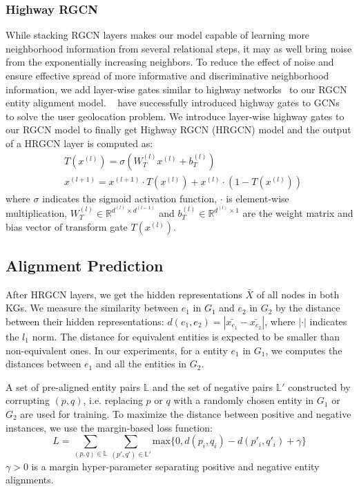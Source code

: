 	
	\subsubsection{Highway RGCN}
	\label{section:hgcn}
	While stacking RGCN layers makes our model capable of learning more neighborhood information from several relational steps, it may as well bring noise from the exponentially increasing neighbors. To reduce the effect of noise and ensure effective spread of more informative and discriminative neighborhood information, we add layer-wise gates similar to highway networks~\cite{Srivastava2015Highway} to our RGCN entity alignment model. ~\cite{Rahimi2018Semi} have successfully introduced highway gates to GCNs~\cite{Kipf2016Semi} to solve the user geolocation problem. We introduce layer-wise highway gates to our RGCN model to finally get Highway RGCN (HRGCN) model and the output of a HRGCN layer is computed as:
	\begin{equation}
	\begin{split}
	&T(x^{(l)})=\sigma(W_T^{(l)}x^{(l)}+b_T^{(l)}) \\
	&x^{(l+1)}=x^{(l+1)} \cdot T(x^{(l)})+x^{(l)} \cdot (1-T(x^{(l)}))
	\end{split}
	\end{equation}
	where $\sigma$ indicates the sigmoid activation function, $\cdot$ is element-wise multiplication, $W_T^{(l)} \in \mathbb{R}^{d^{(l)} \times d^{(l-1)}}$ and $b_T^{(l)} \in \mathbb{R}^{d^{(l)} \times 1}$ are the weight matrix and bias vector of transform gate $T(x^{(l)})$.
	
	\subsection{Alignment Prediction}
	After HRGCN layers, we get the hidden representations $\bar{X}$ of all nodes in both KGs. We measure the similarity between $e_1$ in $G_1$ and $e_2$ in $G_2$ by the distance between their hidden representations: $d(e_1,e_2)=|\bar{x_{e_1}}-\bar{x_{e_2}}|$, where $|\cdot|$ indicates the $l_1$ norm. The distance for equivalent entities is expected to be smaller than non-equivalent ones. In our experiments, for a entity $e_1$ in $G_1$, we computes the distances between $e_1$ and all the entities in $G_2$.
	
	A set of pre-aligned entity pairs $\mathbb{L}$ and the set of negative pairs $\mathbb{L'}$  constructed by corrupting $(p, q)$, i.e. replacing $p$ or $q$ with a randomly chosen entity in $G_1$ or $G_2$ are used for training. To maximize the distance between positive and negative instances, we use the margin-based loss function:
	\begin{equation}
	L=\sum\limits_{(p,q)\in \mathbb{L}}\sum\limits_{(p',q')\in \mathbb{L'}}\mathrm{max}\{0,d(p_i,q_i)-d(p'_i,q'_i)+\gamma\}
	\end{equation}
	$\gamma > 0$ is a margin hyper-parameter separating positive and negative entity alignments.
	
